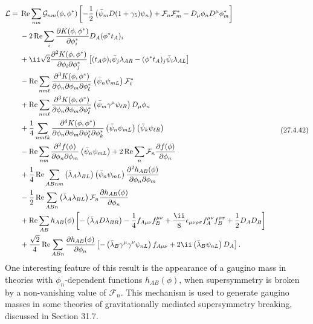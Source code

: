 \begin{equation}
  \begin{aligned}
  \mathcal{L}={}&
  \operatorname{Re}\sum_{nm}\mathcal{G}_{nm}(\phi,\phi^*)
  \left[
    -\frac12\left(\bar\psi_m\sl{D}(1+\gamma_5)\psi_n\right)
    +\mathcal{F}_n\mathcal{F}_m^*
    -D_\mu\phi_nD^\mu\phi_m^*
  \right]
  \\
  &-2\operatorname{Re}\sum_i
    \frac{\partial K(\phi,\phi^*)}{\partial\phi_i^*}
    D_A(\phi^*t_A)_i
  \\
  &+\ii\sqrt{2}
    \frac{\partial^2K(\phi,\phi^*)}
         {\partial\phi_i\partial\phi_j^*}
    \left[
      (t_A\phi)_i\bar\psi_j\lambda_{AR}
      -(\phi^*t_A)_j\bar\psi_i\lambda_{AL}
    \right]
  \\
  &-\operatorname{Re}\sum_{nm\ell}
    \frac{\partial^3K(\phi,\phi^*)}
         {\partial\phi_n\partial\phi_m\partial\phi_\ell^*}
    \left(\bar\psi_n\psi_{mL}\right)\mathcal{F}_\ell^*
  \\
  &+\operatorname{Re}\sum_{nm\ell}
    \frac{\partial^3K(\phi,\phi^*)}
         {\partial\phi_n\partial\phi_m\partial\phi_\ell^*}
    \left(\bar\psi_m\gamma^\mu\psi_{\ell R}\right)D_\mu\phi_n
  \\
  &+\frac14\sum_{nm\ell k}
    \frac{\partial^4K(\phi,\phi^*)}
         {\partial\phi_n\partial\phi_m
          \partial\phi_\ell^*\partial\phi_k^*}
    \left(\bar\psi_n\psi_{mL}\right)
    \left(\bar\psi_k\psi_{\ell R}\right)
  \\
  &-\operatorname{Re}\sum_{nm}
    \frac{\partial^2f(\phi)}{\partial\phi_n\partial\phi_m}
    \left(\bar\psi_n\psi_{mL}\right)
  +2\operatorname{Re}\sum_n
    \mathcal{F}_n\frac{\partial f(\phi)}{\partial\phi_n}
  \\
  &+\frac14\operatorname{Re}\sum_{ABnm}
    \left(\bar\lambda_A\lambda_{BL}\right)
    \left(\bar\psi_n\psi_{mL}\right)
    \frac{\partial^2h_{AB}(\phi)}
         {\partial\phi_n\partial\phi_m}
  \\
  &-\frac12\operatorname{Re}\sum_{ABn}
    \left(\bar\lambda_A\lambda_{BL}\right)\mathcal{F}_n
    \frac{\partial h_{AB}(\phi)}{\partial\phi_n}
  \\
  &+\operatorname{Re}\sum_{AB}h_{AB}(\phi)
  \left[
    -\left(\bar\lambda_A\sl{D}\lambda_{BR}\right)
    -\frac14f_{A\mu\nu}f_B^{\mu\nu}
    +\frac{\ii}{8}\epsilon_{\mu\nu\rho\sigma}
      f_A^{\mu\nu}f_B^{\rho\sigma}
    +\frac12D_AD_B
  \right]
  \\
  &+\frac{\sqrt{2}}4\operatorname{Re}\sum_{ABn}
    \frac{\partial h_{AB}(\phi)}{\partial\phi_n}
    \left[
      -\left(\bar\lambda_B\gamma^\mu\gamma^\nu\psi_{nL}\right)
       f_{A\mu\nu}
      +2\ii\left(\bar\lambda_B\psi_{nL}\right)D_A
    \right].
  \end{aligned}
  \tag{27.4.42}\label{eq:27.4.42}
\end{equation}
One interesting feature of this result is the appearance of a gaugino mass
in theories with \(\phi_n\)-dependent functions \(h_{AB}(\phi)\), when
supersymmetry is broken by a non-vanishing value of \(\mathcal{F}_n\). This
mechanism is used to generate gaugino masses in some theories of
gravitationally mediated supersymmetry breaking, discussed in Section 31.7.
